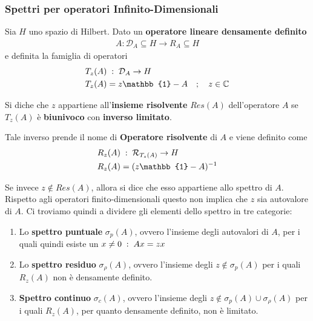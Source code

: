 \newpage

\subsubsection{Spettri per operatori Infinito-Dimensionali}

Sia $H$ uno spazio di Hilbert. Dato un \textbf{operatore lineare densamente definito}
\begin{align}
	A : \mathcal{D}_A \subseteq H \rightarrow R_A \subseteq H
\end{align} 
e definita la famiglia di operatori
\begin{align}
	&T_z(A) \taleche \mathcal{D}_A \rightarrow H\\
	&T_z(A) = z\mathbb{1} - A \spacer z \in \C
\end{align}


Si diche che $z$ appartiene all'\textbf{insieme risolvente} $Res(A)$ dell'operatore $A$ se $T_z (A)$ è \textbf{biunivoco} con \textbf{inverso limitato}.

Tale inverso prende il nome di \textbf{Operatore risolvente} di $A$ e viene definito come
\begin{align}
	&R_z(A) \taleche \mathcal{R}_{T_z(A)} \rightarrow H\\
	&R_z(A) = (z\mathbb{1} - A)^{-1}
\end{align}

Se invece $z \notin Res(A)$, allora si dice che esso appartiene allo spettro di $A$.
Rispetto agli operatori finito-dimensionali questo non implica che $z$ sia autovalore di $A$. Ci troviamo quindi a dividere gli elementi dello spettro in tre categorie:
\begin{enumerate}
	\item Lo \textbf{spettro puntuale} $\sigma_p(A)$, ovvero l'insieme degli autovalori di $A$, per i quali quindi esiste un $x \neq 0 \; : \; Ax = zx$
	
	\item Lo \textbf{spettro residuo} $\sigma_\rho(A)$, ovvero l'insieme degli $z\notin \sigma_p(A)$ per i quali $R_z(A)$ non è densamente definito.
	
	\item \textbf{Spettro continuo} $\sigma_c(A)$, ovvero l'insieme degli $z\notin \sigma_p(A) \cup \sigma_\rho (A)$  per i quali $R_z(A)$, per quanto densamente definito, non è limitato.
\end{enumerate}

\newpage

